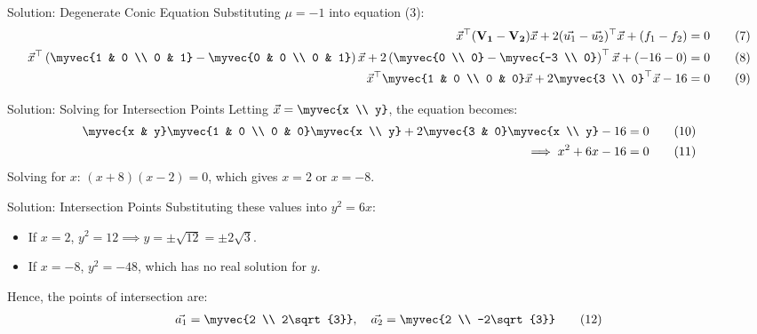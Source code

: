 \documentclass{beamer}
\numberwithin{equation}{section}
\theoremstyle{remark}
\providecommand{\mtx}[1]{\mathbf{#1}}
\begin{document}
\begin{frame}{Solution: Degenerate Conic Equation}
Substituting $\mu = -1$ into equation (3):
\begin{align} 
\vec{x}^\top( \mtx{V_1} - \mtx{V_2} )\vec{x} + 2( \vec{u_1} - \vec{u_2} )^\top\vec{x} + ( f_1 - f_2 ) &= 0 \tag{7} \\
\vec{x}^\top\left( \myvec{1 & 0 \\ 0 & 1} - \myvec{0 & 0 \\ 0 & 1} \right)\vec{x} + 2\left( \myvec{0 \\ 0} - \myvec{-3 \\ 0} \right)^\top\vec{x} + ( -16 - 0 ) &= 0 \tag{8} \\
\vec{x}^\top \myvec{1 & 0 \\ 0 & 0} \vec{x} + 2 \myvec{3 \\ 0}^\top \vec{x} - 16 &= 0 \tag{9}
\end{align}
\end{frame}

\begin{frame}{Solution: Solving for Intersection Points}
Letting $\vec{x} = \myvec{x \\ y}$, the equation becomes:
\begin{align}
\myvec{x & y} \myvec{1 & 0 \\ 0 & 0} \myvec{x \\ y} + 2 \myvec{3 & 0} \myvec{x \\ y} - 16 = 0 \tag{10} \\
\implies x^2 + 6x - 16 = 0 \tag{11}
\end{align}
Solving for $x$: $(x+8)(x-2) = 0$, which gives $x=2$ or $x=-8$.
\end{frame}

\begin{frame}{Solution: Intersection Points}
Substituting these values into $y^2 = 6x$:
\begin{itemize}
    \item If $x=2$, $y^2 = 12 \implies y = \pm\sqrt{12} = \pm 2\sqrt{3}$.
    \item If $x=-8$, $y^2 = -48$, which has no real solution for $y$.
\end{itemize}
\pause
Hence, the points of intersection are:
\begin{align} 
\vec{a_1} = \myvec{2 \\ 2\sqrt{3}}, \quad \vec{a_2} = \myvec{2 \\ -2\sqrt{3}} \tag{12}
\end{align}
\end{frame}
\end{document}
